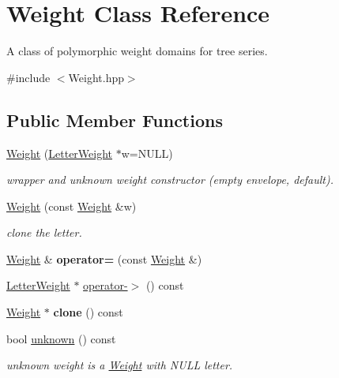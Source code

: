 \hypertarget{classWeight}{}\section{Weight Class Reference}
\label{classWeight}


A class of polymorphic weight domains for tree series.  




{\ttfamily \#include $<$Weight.\+hpp$>$}

\subsection*{Public Member Functions}
\begin{DoxyCompactItemize}
\item 
\mbox{\label{classWeight_ac33fb795eaee8c56d2e4179020a0d2eb}} 
\mbox{\hyperlink{classWeight_ac33fb795eaee8c56d2e4179020a0d2eb}{Weight}} (\mbox{\hyperlink{classLetterWeight}{Letter\+Weight}} $\ast$w=N\+U\+LL)
\begin{DoxyCompactList}\small\item\em wrapper and unknown weight constructor (empty envelope, default). \end{DoxyCompactList}\item 
\mbox{\hyperlink{group__weight_ga9283a1d2c4b91605a0c60a2c7033cb2c}{Weight}} (const \mbox{\hyperlink{classWeight}{Weight}} \&w)
\begin{DoxyCompactList}\small\item\em clone the letter. \end{DoxyCompactList}\item 
\mbox{\hyperlink{classWeight}{Weight}} \& {\bfseries operator=} (const \mbox{\hyperlink{classWeight}{Weight}} \&)
\item 
\mbox{\hyperlink{classLetterWeight}{Letter\+Weight}} $\ast$ \mbox{\hyperlink{classWeight_a6b38fd1721594ffc303858e6201d1b2b}{operator-\/$>$}} () const
\item 
\mbox{\hyperlink{classWeight}{Weight}} $\ast$ {\bfseries clone} () const
\item 
bool \mbox{\hyperlink{group__weight_ga2185b6a5b1957fcab19bf6281adeed47}{unknown}} () const
\begin{DoxyCompactList}\small\item\em unknown weight is a \mbox{\hyperlink{classWeight}{Weight}} with N\+U\+LL letter. \end{DoxyCompactList}\item 

\end{DoxyCompactItemize}
